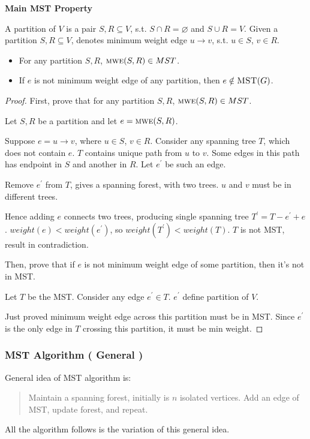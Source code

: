 \noindent \textbf{Main MST Property}

A partition of $V$ is a pair $S,R \subseteq V$,
s.t. $S \cap R = \varnothing$ and $S \cup R = V$.
Given a partition $S,R \subseteq V$, 
denotes minimum weight edge $u\rightarrow v$, s.t. $u \in S$, $v \in R$.
\begin{itemize}
    \item For any partition $S,R$, $\textsc{mwe} (S,R) \in MST$.
    \item If $e$ is not minimum weight edge of any partition,
        then $e \notin \textsc{MST} (G)$.
\end{itemize}

\begin{proof}
    First, prove that for any partition $S,R$, $\textsc{mwe} (S,R) \in MST$.

    Let $S,R$ be a partition and let $e = \textsc{mwe} (S,R)$.

    Suppose $e = u \rightarrow v$, where $u \in S$, $v \in R$.
    Consider any spanning tree $T$, which does not contain $e$.
    $T$ contains unique path from $u$ to $v$.
    Some edges in this path has endpoint in $S$ and another in $R$.
    Let $e^\prime$ be such an edge.

    Remove $e^\prime$ from $T$, gives a spanning forest, with two trees.
    $u$ and $v$ must be in different trees.

    Hence adding $e$ connects two trees, producing single spanning tree
    $T^\prime = T - e^\prime + e$. $weight(e) < weight(e^\prime)$, so $weight(T^\prime) < weight(T)$.
    $T$ is not MST, result in contradiction.

    Then, prove that if $e$ is not minimum weight edge of some partition,
    then it's not in MST.

    Let $T$ be the MST.
    Consider any edge $e^\prime \in T$. $e^\prime$ define partition of $V$.

    Just proved minimum weight edge across this partition must be in MST.
    Since $e^\prime$ is the only edge in $T$ crossing this partition,
    it must be min weight.
\end{proof}

\subsubsection{MST Algorithm ( General )}
General idea of MST algorithm is:
\begin{quote}
Maintain a spanning forest, initially is $n$ isolated vertices.
Add an edge of MST, update forest, and repeat.
\end{quote}
All the algorithm follows is the variation of this general idea.

